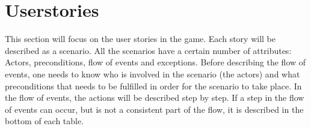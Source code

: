 \section{Userstories}

This section will focus on the user stories in the game. Each story will be described as a scenario. All the scenarios have a certain number of attributes: Actors, preconditions, flow of events and exceptions. Before describing the flow of events, one needs to know who is involved in the scenario (the actors) and what preconditions that needs to be fulfilled in order for the scenario to take place. In the flow of events, the actions will be described step by step. If a step in the flow of events can occur, but is not a consistent part of the flow, it is described in the bottom of each table.\\


